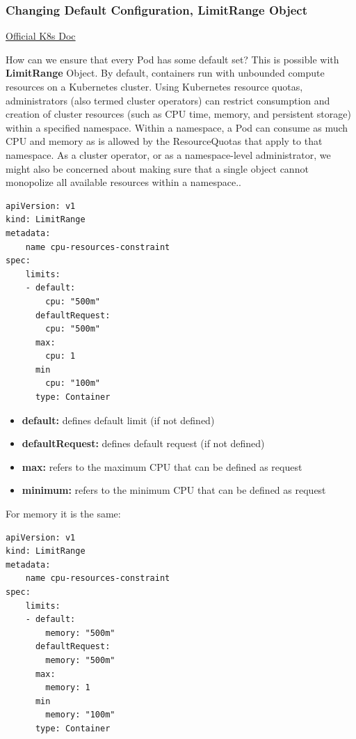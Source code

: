 \documentclass{article}
\newenvironment{codetemplate}[1][]{%
  \mybasecolorbox[#1]
  \itshape
}{%
  \endmybasecolorbox
}
\begin{document}
\subsubsection{Changing Default Configuration, LimitRange Object}

\href{https://kubernetes.io/docs/concepts/policy/limit-range/}{Official K8s Doc}

How can we ensure that every Pod has some default set? This is possible with \textbf{LimitRange} Object. By default, containers run with unbounded compute resources on a Kubernetes cluster. Using Kubernetes resource quotas, administrators (also termed cluster operators) can restrict consumption and creation of cluster resources (such as CPU time, memory, and persistent storage) within a specified namespace. Within a namespace, a Pod can consume as much CPU and memory as is allowed by the ResourceQuotas that apply to that namespace. As a cluster operator, or as a namespace-level administrator, we might also be concerned about making sure that a single object cannot monopolize all available resources within a namespace..

\begin{codetemplate}{}
\begin{verbatim}
apiVersion: v1
kind: LimitRange
metadata:
    name cpu-resources-constraint
spec:
    limits:
    - default:
        cpu: "500m"
      defaultRequest:
        cpu: "500m"
      max:
        cpu: 1
      min
        cpu: "100m"
      type: Container
\end{verbatim}
\end{codetemplate}

\begin{itemize}
    \item \textbf{default:} defines default limit (if not defined)
    \item \textbf{defaultRequest:} defines default request (if not defined)
    \item \textbf{max:} refers to the maximum CPU that can be defined as request
    \item \textbf{minimum:} refers to the minimum CPU that can be defined as request
\end{itemize}

For memory it is the same:
\begin{codetemplate}{}
\begin{verbatim}
apiVersion: v1
kind: LimitRange
metadata:
    name cpu-resources-constraint
spec:
    limits:
    - default:
        memory: "500m"
      defaultRequest:
        memory: "500m"
      max:
        memory: 1
      min
        memory: "100m"
      type: Container
\end{verbatim}
\end{codetemplate}
\end{document}
